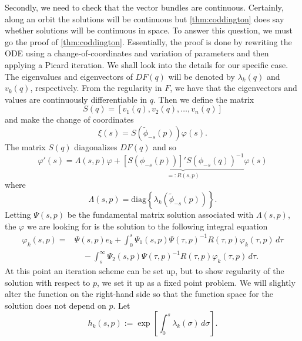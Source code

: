 Secondly, we need to check that the vector bundles are continuous. Certainly, along an orbit the solutions will be continuous but \cref{thm:coddington} does say whether solutions will be continuous in space. To answer this question, we must go the proof of \cref{thm:coddington}. Essentially, the proof is done by rewriting the ODE using a change-of-coordinates and variation of parameters and then applying a Picard iteration. We shall look into the details for our specific case. The eigenvalues and eigenvectors of \(DF(q)\) will be denoted by \(\lambda_k(q)\) and \(v_k(q)\), respectively. From the regularity in \(F\), we have that the eigenvectors and values are continuously differentiable in \(q\). Then we define the matrix
\begin{equation}
	S(q) = [v_1(q), v_2(q), \ldots, v_n(q)]
\end{equation}
and make the change of coordinates
\begin{equation}
	\xi(s) = S(\tilde \phi_{-s} (p)) \varphi(s).
\end{equation}
The matrix \(S(q)\) diagonalizes \(DF(q)\) and so 
\begin{equation}
	\varphi'(s) = \Lambda(s,p)\varphi + \underbrace{[S(\phi_{-s}(p))]' S(\phi_{-s}(q))^{-1}}_{=: R(s,p)} \varphi(s)
\end{equation}
where 
\begin{equation}
	\Lambda(s,p) = \mathrm{diag} \left\{  \lambda_k(\tilde\phi_{-s}(p))\right\}.
\end{equation}
Letting \(\Psi(s,p)\) be the fundamental matrix solution associated with \(\Lambda(s,p)\), the \(\varphi\) we are looking for is the solution to the following integral equation
\begin{equation}\label{variation-of-constants}
\begin{aligned}
		\varphi_k(s,p) = &\Psi(s,p) e_k + \int_0^s \Psi_1(s, p) \Psi(\tau, p)^{-1}R(\tau, p) \varphi_k(\tau,p)\, d\tau \\
		&\quad - \int_s^\infty \Psi_2(s,p) \Psi(\tau, p)^{-1} R(\tau, p) \varphi_k(\tau, p)\, d\tau.
\end{aligned}
\end{equation}
At this point an iteration scheme can be set up, but to show regularity of the solution with respect to \(p\), we set it up as a fixed point problem. We will slightly alter the function on the right-hand side so that the function space for the solution does not depend on \(p\). Let 
\begin{equation}
	h_k(s,p) := \exp\left[\int_0^s \lambda_k(\sigma)\, d\sigma\right].
\end{equation}
